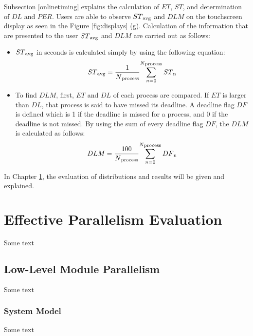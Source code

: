 Subsection \ref{onlinetiming} explains the calculation of ${ET}$, ${ST}$, and determination of ${DL}$ and ${PER}$. Users are able to observe ${ST\textsubscript{avg}}$ and ${DLM}$ on the touchscreen display as seen in the Figure \ref{fig:displays} (g). Calculation of the information that are presented to the user ${ST\textsubscript{avg}}$ and ${DLM}$ are carried out as follows:

\begin{itemize}
	\item ${ST\textsubscript{avg}}$ in seconds is calculated simply by using the following equation:
	\begin{equation}
	ST\textsubscript{avg} =  {\frac{1}{N\textsubscript{process}}} {\sum_{n=0}^{N\textsubscript{process}} ST\textsubscript{n}} 
	\end{equation}
	\item To find ${DLM}$, first, ${ET}$ and ${DL}$ of each process are compared. If ${ET}$ is larger than ${DL}$, that process is said to have missed its deadline. A deadline flag ${DF}$ is defined which is 1 if the deadline is missed for a process, and 0 if the deadline is not missed. By using the sum of every deadline flag ${DF}$, the ${DLM}$ is calculated as follows:
	\begin{equation}
	DLM =  {\frac{100}{N\textsubscript{process}}} {\sum_{n=0}^{N\textsubscript{process}} DF\textsubscript{n}} 
	\end{equation}
\end{itemize}
In Chapter \ref{evaluationchapter}, the evaluation of distributions and results will be given and explained.

\chapter{Effective Parallelism Evaluation}\label{evaluationchapter}
Some text \\
\section{Low-Level Module Parallelism} %
Some text \\
\subsection{System Model}
Some text \\
